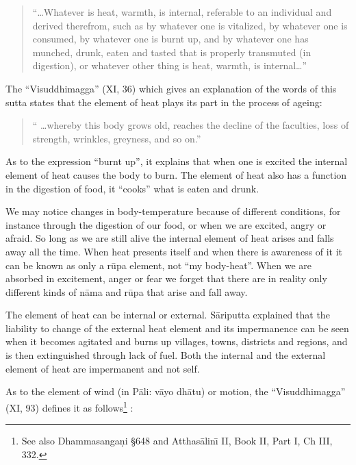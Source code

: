 \documentclass{book}
\begin{document}
\begin{quote}\begin{flushleft}
``\ldots Whatever is heat, warmth, is internal, referable to an individual
and derived therefrom, such as by whatever one is vitalized, by
whatever one is consumed, by whatever one is burnt up, and by whatever
one has munched, drunk, eaten and tasted that is properly transmuted
(in digestion), or whatever other thing is heat, warmth, is
internal\ldots''
\end{flushleft}\end{quote}




The ``Visuddhimagga'' (XI, 36) which gives an explanation of the words
of this sutta states that the element of heat plays its part in the
process of ageing: 
\begin{quotation}\begin{flushleft}
`` \ldots whereby this body grows old, reaches the
decline of the faculties, loss of strength, wrinkles, greyness, and so
on.''
\end{flushleft}\end{quotation}
As to the expression ``burnt up'', it explains that when one is
excited the internal element of heat causes the body to burn. The
element of heat also has a function in the digestion of food, it
``cooks'' what is eaten and drunk.

We may notice changes in body-temperature because of different
conditions, for instance through the digestion of our food, or when we
are excited, angry or afraid. So long as we are still alive the
internal element of heat arises and falls away all the time. When heat
presents itself and when there is awareness of it it can be known as
only a r\=upa element, not ``my body-heat''. When we are absorbed in
excitement, anger or fear we forget that there are in reality only
different kinds of n{\=a}ma and r\=upa that arise and fall away. 

The element of heat can be internal or external. S{\=a}riputta explained
that the liability to change of the external heat element and its
impermanence can be seen when it becomes agitated and burns up
villages, towns, districts and regions, and is then extinguished
through lack of fuel. Both the internal and the external element of
heat are impermanent and not self.

As to the element of wind (in P{\=a}li: v{\=a}yo dh{\=a}tu) or motion,
the ``Visuddhimagga'' (XI, 93) defines it as follows\footnote{See
also Dhamma\-sanga\d ni {\S}648 and Atthas{\=a}lin\=\i{}  II, Book II, Part
I, Ch III, 332.} : 
\end{document}

